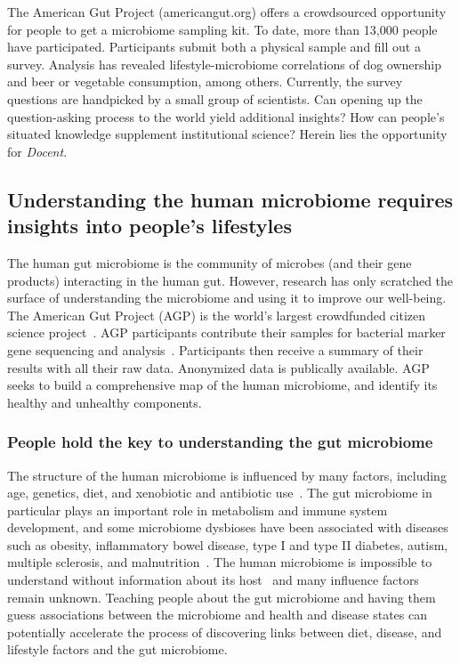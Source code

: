 The American Gut Project (americangut.org) offers a
crowdsourced opportunity for people to get a microbiome
sampling kit. To date, more than 13,000 people have participated.
Participants submit both a physical sample and fill out
a survey. Analysis has revealed lifestyle-microbiome correlations
of dog ownership and beer or vegetable consumption,
among others. Currently, the survey questions are handpicked
by a small group of scientists. Can opening up the
question-asking process to the world yield additional insights?
How can people’s situated knowledge supplement institutional
science? Herein lies the opportunity for \textit{Docent}.


\subsection{Understanding the human microbiome requires insights into people’s lifestyles}
The human gut microbiome is the community of microbes (and their gene products) interacting in the human gut. However, research has only scratched the surface of understanding the microbiome and using it to improve our well-being. The American Gut Project (AGP) is the world's largest crowdfunded citizen science project~\cite{KnightLab2016a}. AGP participants contribute their samples for bacterial marker gene sequencing and analysis~\cite{Debelius2016}. Participants then receive a summary of their results with all their raw data. Anonymized data is publically available. AGP seeks to build a comprehensive map of the human microbiome, and identify its healthy and unhealthy components.

\subsubsection{People hold the key to understanding the gut microbiome}
The structure of the human microbiome is influenced by many factors, including age, genetics, diet, and xenobiotic and antibiotic use~\cite{Gill2006}. The gut microbiome in particular plays an important role in metabolism and immune system development, and some microbiome dysbioses have been associated with diseases such as obesity, inflammatory bowel disease, type I and type II diabetes, autism, multiple sclerosis, and malnutrition~\cite{Cho2012}. The human microbiome is impossible to understand without information about its host~\cite{Debelius2016} and many influence factors remain unknown. Teaching people about the gut microbiome and having them guess associations between the microbiome and health and disease states can potentially accelerate the process of discovering links between diet, disease, and lifestyle factors and the gut microbiome.



